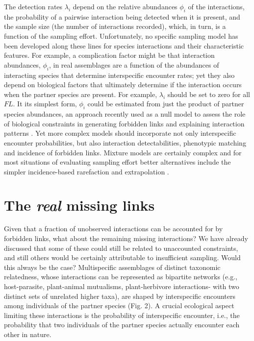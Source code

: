 \documentclass[12pt]{article}
\begin{document}
The detection rates $\lambda_i$ depend on the relative abundances $\phi_i$ of the interactions, the probability of a pairwise interaction being detected when it is present, and the sample size (the number of interactions recorded), which, in turn, is a function of the sampling effort. Unfortunately, no specific sampling model has been developed along these lines for species interactions and their characteristic features. For example, a complication factor might be that interaction abundances, $\phi_i$, in real assemblages are a function of the abundances of interacting species that determine interspecific encounter rates; yet they also depend on biological factors that ultimately determine if the interaction occurs when the partner species are present. For example, $\lambda_i$ should be set to zero for all $FL$. It its simplest form, $\phi_i$ could be estimated from just the product of partner species abundances, an approach recently used as a null model to assess the role of biological constraints in generating forbidden links and explaining interaction patterns \citep{Vizentin-Bugoni:2014hc}. Yet more complex models \citeyearpar[e.g., Wells \& O'hara ][]{Wells:2012dy} should incorporate not only interspecific encounter probabilities, but also interaction detectabilities, phenotypic matching and incidence of forbidden links. Mixture models are certainly complex and for most situations of evaluating sampling effort better alternatives include the simpler incidence-based rarefaction and extrapolation \citep{Colwell:2012fc,Chao:2014wm}.  

\section*{The \emph{real} missing links}
\label{therealmissinglinks}

Given that a fraction of unobserved interactions can be accounted for by forbidden links, what about the remaining missing interactions? We have already discussed that some of these could still be related to unaccounted constraints, and still others would be certainly attributable to insufficient sampling. Would this always be the case? Multispecific assemblages of distinct taxonomic relatedness, whose interactions can be represented as bipartite networks (e.g., host-parasite, plant-animal mutualisms, plant-herbivore interactions- with two distinct sets of unrelated higher taxa), are shaped by interspecific encounters among individuals of the partner species (Fig. 2). A crucial ecological aspect limiting these interactions is the probability of interspecific encounter, i.e., the probability that two individuals of the partner species actually encounter each other in nature. 
\end{document}
